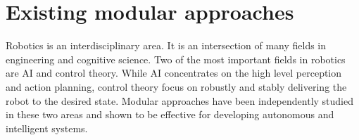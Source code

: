 


\section{Existing modular approaches}
\label{cha1:modular}
Robotics is an interdisciplinary area. It is an intersection of many fields in engineering and cognitive science. Two of the most important fields in robotics are AI and control theory. While AI concentrates on the high level perception and action planning, control theory focus on robustly and stably delivering the robot to the desired state. Modular approaches have been independently studied in these two areas and shown to be effective for developing autonomous and intelligent systems.

